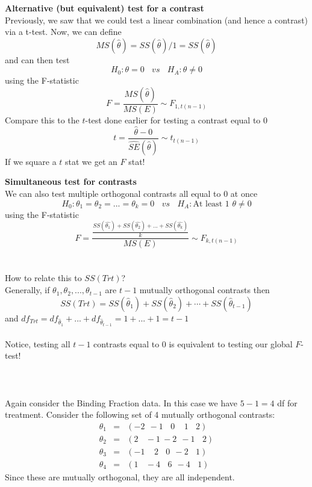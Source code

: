 \textbf{Alternative (but equivalent) test for a contrast}\\
Previously, we saw that we could test a linear combination (and hence a contrast) via a t-test.  Now, we can define 
$$MS(\hat{\theta})=SS(\hat{\theta})/1=SS(\hat{\theta})$$
and can then test
$$H_0:\theta=0~~~~vs~~~~H_A:\theta\neq 0$$
using the F-statistic
$$F=\frac{MS(\hat{\theta})}{MS(E)}\sim F_{1,t(n-1)}$$
Compare this to the $t$-test done earlier for testing a contrast equal to 0
$$t=\frac{\hat{\theta}-0}{\hat{SE}(\hat{\theta})}\sim t_{t(n-1)}$$
If we square a $t$ stat we get an $F$ stat!

\newpage

\textbf{Simultaneous test for contrasts}\\
We can also test multiple orthogonal contrasts all equal to 0 at once
$$H_0:\theta_1=\theta_2=...=\theta_k=0~~~~vs~~~~H_A:\mbox{At least 1 }\theta\neq 0$$
using the F-statistic
$$F=\frac{\frac{SS(\hat{\theta_1})+SS(\hat{\theta_2})+...+SS(\hat{\theta_k})}{k}}{MS(E)}\sim F_{k,t(n-1)}$$
~\\~\\
How to relate this to $SS(Trt)$? \\
Generally, if $\theta_1,\theta_2,...,\theta_{t-1}$ are $t-1$ mutually orthogonal contrasts then
$$ SS(Trt)=SS(\hat\theta_1)+SS(\hat\theta_2)+\cdots+SS(\hat\theta_{t-1})$$
and $df_{Trt}=df_{\hat\theta_1}+...+df_{\hat\theta_{t-1}}=1+...+1=t-1$\\~\\
Notice, testing all $t-1$ contrasts equal to 0 is equivalent to testing our global $F$-test!\\~\\~\\~\\

Again consider the Binding Fraction data.  In this case we have $5-1=4$ df for treatment.  Consider the following set of 4 mutually orthogonal contrasts:
\begin{eqnarray*}
\theta_1&=&(-2~~-1~~~~0~~~~~1~~~~2)\\
\theta_2&=&(2~~~~-1~-2~~-1~~~~2)\\
\theta_3&=&(-1~~~~~2~~~~0~~-2~~~~1)\\
\theta_4&=&(1~~~~-4~~~~6~~-4~~~~1)
\end{eqnarray*}
Since these are mutually orthogonal, they are all independent.\\

